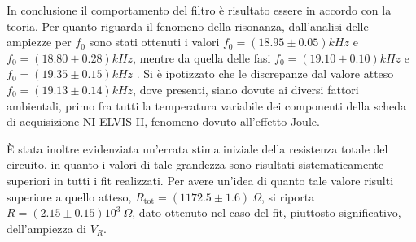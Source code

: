

In conclusione il comportamento del filtro è risultato essere in accordo con la teoria.
Per quanto riguarda il fenomeno della risonanza, dall'analisi delle ampiezze per $f_0$ sono stati
ottenuti i valori $f_0 = (18.95 \pm 0.05) kHz$ e $f_0 = (18.80 \pm 0.28)kHz$, mentre
da quella delle fasi $f_0 = (19.10 \pm 0.10)kHz$ e $f_0 = (19.35 \pm 0.15)kHz$ .
Si è ipotizzato che le discrepanze dal valore atteso  $f_0 = (19.13 \pm 0.14) kHz$, dove presenti, siano dovute ai diversi fattori ambientali, primo fra tutti la temperatura
variabile dei componenti della scheda di acquisizione NI ELVIS II, fenomeno dovuto all’effetto Joule.

È stata inoltre evidenziata un'errata stima iniziale della resistenza totale del circuito, in quanto i valori di tale
grandezza sono risultati sistematicamente superiori in tutti i fit realizzati.
Per avere un'idea di quanto tale valore risulti superiore a quello atteso, $R_{\text{tot}} = (1172.5 \pm 1.6) \ \Omega$, si riporta
$R =( 2.15 \pm 0.15 )10^3 \ \Omega$, dato ottenuto nel caso del fit, piuttosto significativo, dell'ampiezza di $V_R$.
